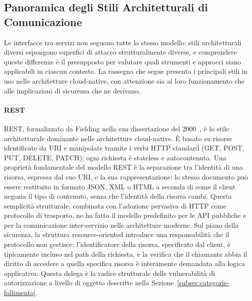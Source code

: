 \subsection{Panoramica degli Stili Architetturali di Comunicazione}\label{subsec:tassonomia-stili}

Le interfacce tra servizi non seguono tutte lo stesso modello: stili architetturali diversi espongono superfici di attacco strutturalmente diverse, e comprendere queste differenze è il presupposto per valutare quali strumenti e approcci siano applicabili in ciascun contesto. La rassegna che segue presenta i principali stili in uso nelle architetture cloud-native, con attenzione sia al loro funzionamento che alle implicazioni di sicurezza che ne derivano.

\paragraph{REST}
\gls{REST}, formalizzato da Fielding nella sua dissertazione del 2000~\cite{fieldingArchitecturalStylesDesign2000},
è lo stile architetturale dominante nelle architetture cloud-native. È basato su risorse identificate da \gls{URI} e manipolate tramite i verbi \gls{HTTP} standard (GET, POST, PUT, DELETE, PATCH); ogni richiesta è stateless e autocontenuta. Una proprietà fondamentale del modello REST è la separazione tra l'identità di una risorsa, espressa dal suo \gls{URI}, e la sua rappresentazione: lo stesso documento può essere restituito in formato JSON, XML o HTML a seconda di come il client negozia il tipo di contenuto, senza che l'identità della risorsa cambi. Questa semplicità strutturale, combinata con l'adozione pervasiva di \gls{HTTP} come protocollo di trasporto, ne ha fatto il modello predefinito per le \gls{API} pubbliche e per la comunicazione inter-servizio nelle architetture moderne. Sul piano della sicurezza, la struttura resource-oriented introduce una responsabilità che il protocollo non gestisce: l'identificatore della risorsa, specificato dal client, è tipicamente incluso nel path della richiesta, e la verifica che il chiamante abbia il diritto di accedere a quella specifica risorsa è interamente demandata alla logica applicativa. Questa delega è la radice strutturale delle vulnerabilità di autorizzazione a livello di oggetto descritte nella Sezione~\ref{subsec:categorie-fallimento}.

